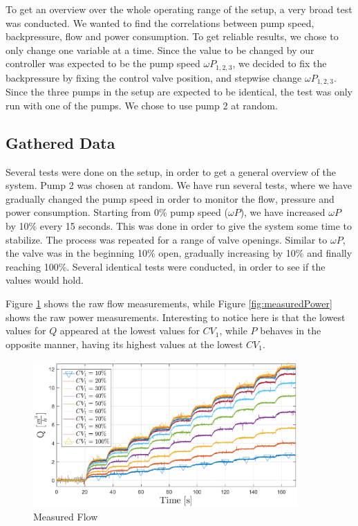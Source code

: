 To get an overview over the whole operating range of the setup,
a very broad test was conducted.
We wanted to find the correlations between pump speed, backpressure, flow and power consumption.
To get reliable results, we chose to only change one variable at a time.
Since the value to be changed by our controller was expected to be the pump speed $\omega P_{1,2,3}$,
we decided to fix the backpressure by fixing the control valve position,
and stepwise change $\omega P_{1,2,3}$.
Since the three pumps in the setup are expected to be identical,
the test was only run with one of the pumps.
We chose to use pump 2 at random.

\subsection{Gathered Data}
Several tests were done on the setup, in order to get a general overview of the system.
Pump 2 was chosen at random.
We have run several tests, where we have gradually changed the pump speed in order to monitor
the flow, pressure and power consumption.
Starting from 0\% pump speed ($\omega P$), we have increased $\omega P$ by 10\% every 15 seconds.
This was done in order to give the system some time to stabilize.
The process was repeated for a range of valve openings.
Similar to $\omega P$, the valve was in the beginning 10\% open,
gradually increasing by 10\% and finally reaching 100\%.
Several identical tests were conducted, in order to see if the values would hold.

Figure \ref{fig:measuredFlow} shows the raw flow measurements,
while Figure \ref{fig:measuredPower} shows the raw power measurements.
Interesting to notice here is that the lowest values for $Q$ appeared at the lowest values for $CV_1$,
while $P$ behaves in the opposite manner, having its highest values at the lowest $CV_1$.

\begin{figure}[H]
	\centering
	\includegraphics[width=0.9\textwidth]{figures/05mathematicalModelling/measuredFlow.eps}
	\caption{Measured Flow}
	\label{fig:measuredFlow}
\end{figure}

